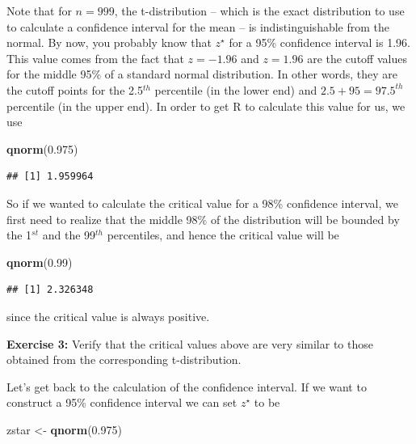 \documentclass[
]{article}
\newenvironment{Shaded}{\begin{snugshade}}{\end{snugshade}}
\newcommand{\FloatTok}[1]{\textcolor[rgb]{0.00,0.00,0.81}{#1}}
\newcommand{\FunctionTok}[1]{\textcolor[rgb]{0.13,0.29,0.53}{\textbf{#1}}}
\newcommand{\NormalTok}[1]{#1}
\newcommand{\OtherTok}[1]{\textcolor[rgb]{0.56,0.35,0.01}{#1}}
\begin{document}
Note that for \(n=999\), the t-distribution -- which is the exact
distribution to use to calculate a confidence interval for the mean --
is indistinguishable from the normal. By now, you probably know that
\(z^\star\) for a 95\% confidence interval is 1.96. This value comes
from the fact that \(z = -1.96\) and \(z = 1.96\) are the cutoff values
for the middle 95\% of a standard normal distribution. In other words,
they are the cutoff points for the 2.5\(^{th}\) percentile (in the lower
end) and \(2.5 + 95 = 97.5^{th}\) percentile (in the upper end). In
order to get R to calculate this value for us, we use

\begin{Shaded}
\begin{Highlighting}[]
\FunctionTok{qnorm}\NormalTok{(}\FloatTok{0.975}\NormalTok{)}
\end{Highlighting}
\end{Shaded}

\begin{verbatim}
## [1] 1.959964
\end{verbatim}

So if we wanted to calculate the critical value for a 98\% confidence
interval, we first need to realize that the middle 98\% of the
distribution will be bounded by the 1\(^{st}\) and the 99\(^{th}\)
percentiles, and hence the critical value will be

\begin{Shaded}
\begin{Highlighting}[]
\FunctionTok{qnorm}\NormalTok{(}\FloatTok{0.99}\NormalTok{)}
\end{Highlighting}
\end{Shaded}

\begin{verbatim}
## [1] 2.326348
\end{verbatim}

since the critical value is always positive.

\textbf{Exercise 3:} Verify that the critical values above are very
similar to those obtained from the corresponding t-distribution.

Let's get back to the calculation of the confidence interval. If we want
to construct a 95\% confidence interval we can set \(z^\star\) to be

\begin{Shaded}
\begin{Highlighting}[]
\NormalTok{zstar }\OtherTok{\textless{}{-}} \FunctionTok{qnorm}\NormalTok{(}\FloatTok{0.975}\NormalTok{)}
\end{Highlighting}
\end{Shaded}
\end{document}
